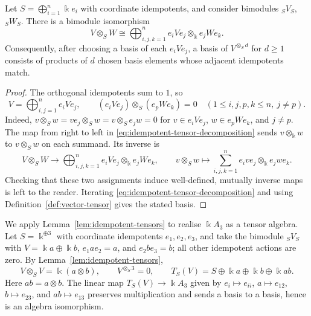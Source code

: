 \begin{lemma}\label{lem:idempotent-tensors}
Let $S=\bigoplus_{i=1}^n\Bbbk e_i$ with coordinate idempotents, and consider bimodules ${}_SV_S$, ${}_SW_S$.
There is a bimodule isomorphism
\begin{equation}\label{eq:idempotent-tensor-decomposition}
V\otimes_S W\cong\bigoplus_{i,j,k=1}^n e_iVe_j\otimes_\Bbbk e_jWe_k.
\end{equation}
Consequently, after choosing a basis of each $e_iVe_j$, a basis of $V^{\otimes_S d}$ for $d\geq1$ consists of products of $d$ chosen basis elements whose adjacent idempotents match.
\end{lemma}
\begin{supplementary}
\begin{proof}
The orthogonal idempotents sum to $1$, so
\begin{equation}\label{eq:composable-tensors}
V=\bigoplus_{i,j=1}^n e_iVe_j,\qquad
(e_iVe_j)\otimes_S(e_pWe_k)=0
\quad(1\leq i,j,p,k\leq n,\ j\neq p).
\end{equation}
Indeed, $v\otimes_S w=ve_j\otimes_S w=v\otimes_S e_jw=0$ for $v\in e_iVe_j$, $w\in e_pWe_k$, and $j\neq p$.
The map from right to left in \eqref{eq:idempotent-tensor-decomposition} sends $v\otimes_\Bbbk w$ to $v\otimes_S w$ on each summand.
Its inverse is
\[
V\otimes_S W\longrightarrow\bigoplus_{i,j,k=1}^n e_iVe_j\otimes_\Bbbk e_jWe_k,
\qquad
v\otimes_S w\longmapsto\sum_{i,j,k=1}^n e_ive_j\otimes_\Bbbk e_jwe_k.
\]
Checking that these two assignments induce well-defined, mutually inverse maps is left to the reader.
Iterating \eqref{eq:idempotent-tensor-decomposition} and using Definition~\ref{def:vector-tensor} gives the stated basis.
\end{proof}
\end{supplementary}


\begin{example}\label{ex:tensor-A3}
We apply Lemma~\ref{lem:idempotent-tensors} to realise $\Bbbk A_3$ as a tensor algebra.
Let $S=\Bbbk^{\oplus3}$ with coordinate idempotents $e_1,e_2,e_3$, and take the bimodule ${}_SV_S$ with $V=\Bbbk a\oplus\Bbbk b$, $e_1ae_2=a$, and $e_2be_3=b$; all other idempotent actions are zero.
By Lemma~\ref{lem:idempotent-tensors},
\[
V\otimes_S V=\Bbbk(a\otimes b),\qquad
V^{\otimes_S3}=0,\qquad
T_S(V)=S\oplus\Bbbk a\oplus\Bbbk b\oplus\Bbbk ab.
\]
Here $ab=a\otimes b$.
The linear map $T_S(V)\to\Bbbk A_3$ given by $e_i\mapsto e_{ii}$, $a\mapsto e_{12}$, $b\mapsto e_{23}$, and $ab\mapsto e_{13}$ preserves multiplication and sends a basis to a basis, hence is an algebra isomorphism.
\end{example}


